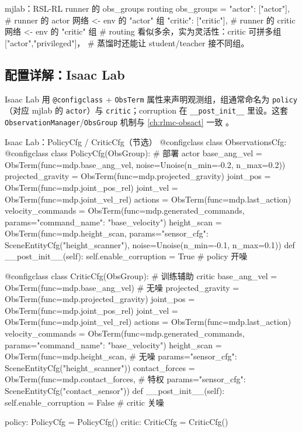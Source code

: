 \begin{codebox}[Python]{mjlab：RSL-RL runner 的 obs\_groups routing}
obs_groups = {
    "actor":  ["actor"],     # runner 的 actor 网络 <- env 的 "actor" 组
    "critic": ["critic"],    # runner 的 critic 网络 <- env 的 "critic" 组
}
# routing 看似多余，实为灵活性：critic 可拼多组 ["actor","privileged"]，
# 蒸馏时还能让 student/teacher 接不同组。
\end{codebox}

\subsection{配置详解：Isaac Lab}
\label{sec:rlmc-priv-cfg-isaac}

Isaac Lab 用 \verb|@configclass| + \verb|ObsTerm| 属性来声明观测组，组通常命名为 \verb|policy|（对应 mjlab 的 \verb|actor|）与 \verb|critic|；corruption 在 \verb|__post_init__| 里设。这套 \verb|ObservationManager|/\verb|ObsGroup| 机制与 \cref{ch:rlmc-obsact} 一致 \cite{isaaclab2024}。

\begin{codebox}[Python]{Isaac Lab：PolicyCfg / CriticCfg（节选）}
@configclass
class ObservationsCfg:
    @configclass
    class PolicyCfg(ObsGroup):            # 部署 actor
        base_ang_vel = ObsTerm(func=mdp.base_ang_vel,
                               noise=Unoise(n_min=-0.2, n_max=0.2))
        projected_gravity = ObsTerm(func=mdp.projected_gravity)
        joint_pos = ObsTerm(func=mdp.joint_pos_rel)
        joint_vel = ObsTerm(func=mdp.joint_vel_rel)
        actions  = ObsTerm(func=mdp.last_action)
        velocity_commands = ObsTerm(func=mdp.generated_commands,
                                    params={"command_name": "base_velocity"})
        height_scan = ObsTerm(func=mdp.height_scan,
            params={"sensor_cfg": SceneEntityCfg("height_scanner")},
            noise=Unoise(n_min=-0.1, n_max=0.1))
        def __post_init__(self):
            self.enable_corruption = True          # policy 开噪

    @configclass
    class CriticCfg(ObsGroup):            # 训练辅助 critic
        base_ang_vel = ObsTerm(func=mdp.base_ang_vel)        # 无噪
        projected_gravity = ObsTerm(func=mdp.projected_gravity)
        joint_pos = ObsTerm(func=mdp.joint_pos_rel)
        joint_vel = ObsTerm(func=mdp.joint_vel_rel)
        actions  = ObsTerm(func=mdp.last_action)
        velocity_commands = ObsTerm(func=mdp.generated_commands,
                                    params={"command_name": "base_velocity"})
        height_scan = ObsTerm(func=mdp.height_scan,          # 无噪
            params={"sensor_cfg": SceneEntityCfg("height_scanner")})
        contact_forces = ObsTerm(func=mdp.contact_forces,    # 特权
            params={"sensor_cfg": SceneEntityCfg("contact_sensor")})
        def __post_init__(self):
            self.enable_corruption = False         # critic 关噪

    policy: PolicyCfg = PolicyCfg()
    critic: CriticCfg = CriticCfg()
\end{codebox}

